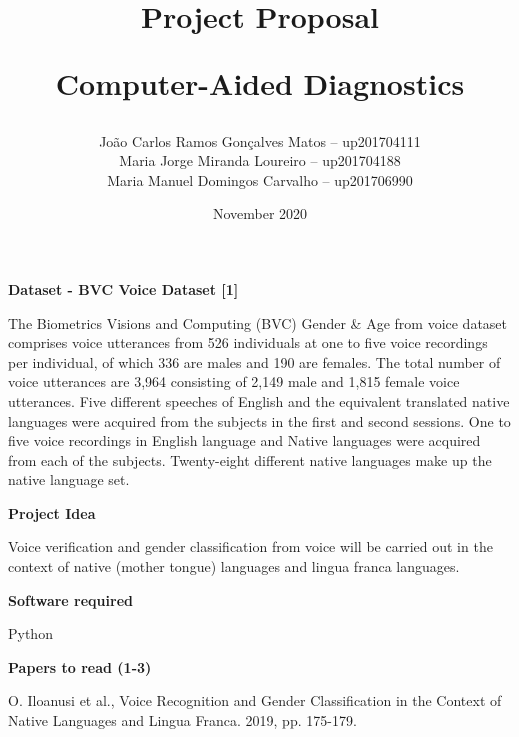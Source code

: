 \documentclass{article}
\title{\textbf{Project Proposal}\par Computer-Aided Diagnostics}
\author{
João Carlos Ramos Gonçalves Matos – up201704111\\
Maria Jorge Miranda Loureiro – up201704188\\
Maria Manuel Domingos Carvalho – up201706990\\
}
\date{\nth{10} November 2020}
\begin{document}
\maketitle

\vspace{5mm}
\justify
\setlength{\parindent}{0pt}

\textbf{Dataset - BVC Voice Dataset [1]}\par

The Biometrics Visions and Computing (BVC) Gender & Age from voice dataset comprises voice utterances from 526 individuals at one to five voice recordings per individual, of which 336 are males and 190 are females. The total number of voice utterances are 3,964 consisting of 2,149 male and 1,815 female voice utterances. Five different speeches of English and the equivalent translated native languages were acquired from the subjects in the first and second sessions. One to five voice recordings in English language and Native languages were acquired from each of the subjects. Twenty-eight different native languages make up the native language set.\par


\vspace{5mm}
\textbf{Project Idea}\par
Voice verification and gender classification from voice will be carried out in the context of native (mother tongue) languages and lingua franca languages.\par

\vspace{5mm}
\textbf{Software required}\par
Python

\vspace{5mm}
\textbf{Papers to read (1-3)}\par
[1]	O. Iloanusi et al., Voice Recognition and Gender Classification in the Context of Native Languages and Lingua Franca. 2019, pp. 175-179.
\end{document}
